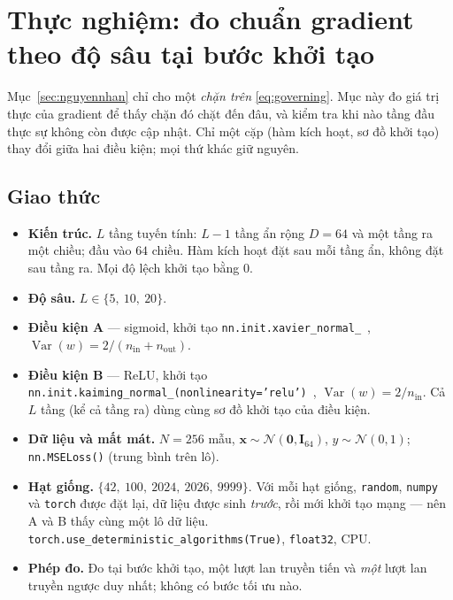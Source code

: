 \section{Thực nghiệm: đo chuẩn gradient theo độ sâu tại bước khởi tạo}
\label{sec:thucnghiem}

Mục~\ref{sec:nguyennhan} chỉ cho một \emph{chặn trên} \eqref{eq:governing}. Mục
này đo giá trị thực của gradient để thấy chặn đó chặt đến đâu, và kiểm tra khi
nào tầng đầu thực sự không còn được cập nhật. Chỉ một cặp (hàm kích hoạt, sơ đồ
khởi tạo) thay đổi giữa hai điều kiện; mọi thứ khác giữ nguyên.

\subsection{Giao thức}

\begin{itemize}[leftmargin=*, itemsep=2pt]
  \item \textbf{Kiến trúc.} $L$ tầng tuyến tính: $L-1$ tầng ẩn rộng $D=64$ và
    một tầng ra một chiều; đầu vào $64$ chiều. Hàm kích hoạt đặt sau mỗi tầng ẩn,
    không đặt sau tầng ra. Mọi độ lệch khởi tạo bằng $0$.
  \item \textbf{Độ sâu.} $L \in \{5,\ 10,\ 20\}$.
  \item \textbf{Điều kiện A} --- sigmoid, khởi tạo
    \texttt{nn.init.xavier\_normal\_}~\cite{GlorotBengio2010},
    $\operatorname{Var}(w) = 2/(n_{\text{in}}+n_{\text{out}})$.
  \item \textbf{Điều kiện B} --- ReLU, khởi tạo
    \texttt{nn.init.kaiming\_normal\_(nonlinearity='relu')}~\cite{He2015},
    $\operatorname{Var}(w) = 2/n_{\text{in}}$.
    Cả $L$ tầng (kể cả tầng ra) dùng cùng sơ đồ khởi tạo của điều kiện.
  \item \textbf{Dữ liệu và mất mát.} $N=256$ mẫu,
    $\mathbf{x}\sim\mathcal{N}(\mathbf{0},\mathbf{I}_{64})$,
    $y\sim\mathcal{N}(0,1)$; \texttt{nn.MSELoss()} (trung bình trên lô).
  \item \textbf{Hạt giống.} $\{42,\ 100,\ 2024,\ 2026,\ 9999\}$. Với mỗi hạt giống,
    \texttt{random}, \texttt{numpy} và \texttt{torch} được đặt lại, dữ liệu được
    sinh \emph{trước}, rồi mới khởi tạo mạng --- nên A và B thấy cùng một lô dữ
    liệu. \texttt{torch.use\_deterministic\_algorithms(True)}, \texttt{float32},
    CPU.
  \item \textbf{Phép đo.} Đo tại bước khởi tạo, một lượt lan truyền tiến và
    \emph{một} lượt lan truyền ngược duy nhất; không có bước tối ưu nào.
\end{itemize}

